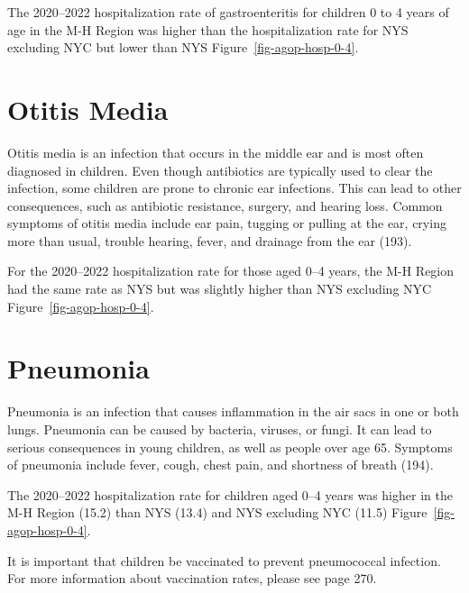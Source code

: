 \documentclass[
  english,
  letterpaper,
]{report}
\begin{document}
The 2020--2022 hospitalization rate of gastroenteritis for children 0 to
4 years of age in the M-H Region was higher than the hospitalization
rate for NYS excluding NYC but lower than NYS
Figure~\ref{fig-agop-hosp-0-4}.

\section{Otitis Media}\label{otitis-media}

Otitis media is an infection that occurs in the middle ear and is most
often diagnosed in children. Even though antibiotics are typically used
to clear the infection, some children are prone to chronic ear
infections. This can lead to other consequences, such as antibiotic
resistance, surgery, and hearing loss. Common symptoms of otitis media
include ear pain, tugging or pulling at the ear, crying more than usual,
trouble hearing, fever, and drainage from the ear (193).

For the 2020--2022 hospitalization rate for those aged 0--4 years, the
M-H Region had the same rate as NYS but was slightly higher than NYS
excluding NYC Figure~\ref{fig-agop-hosp-0-4}.

\section{Pneumonia}\label{pneumonia}

Pneumonia is an infection that causes inflammation in the air sacs in
one or both lungs. Pneumonia can be caused by bacteria, viruses, or
fungi. It can lead to serious consequences in young children, as well as
people over age 65. Symptoms of pneumonia include fever, cough, chest
pain, and shortness of breath (194).

The 2020--2022 hospitalization rate for children aged 0--4 years was
higher in the M-H Region (15.2) than NYS (13.4) and NYS excluding NYC
(11.5) Figure~\ref{fig-agop-hosp-0-4}.

It is important that children be vaccinated to prevent pneumococcal
infection. For more information about vaccination rates, please see page
270.
\end{document}
